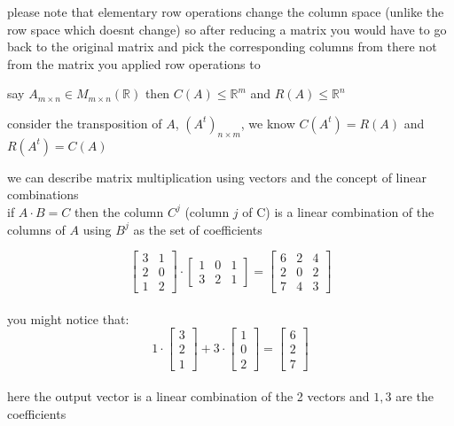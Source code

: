 \documentclass[a4paper,12pt]{article}
\begin{document}
\begin{definition}
\begin{note}
please note that elementary row operations change the column space (unlike the row space which doesnt change) so after reducing a matrix you would have to go back to the original matrix and pick the corresponding columns from there not from the matrix you applied row operations to\\
\end{note}
\begin{my_example}
say \(A_{m \times n} \in M_{m \times n}(\mathbb{R})\) then \(C(A) \leq \mathbb{R}^m\) and \(R(A) \leq \mathbb{R}^n\)\\
\end{my_example}
\begin{characteristic}
consider the transposition of \(A\), \((A^t)_{n \times m}\), we know \(C(A^t) = R(A)\) and \(R(A^t) = C(A)\)\\
\end{characteristic}
\begin{characteristic}
we can describe matrix multiplication using vectors and the concept of linear combinations\\
if \(A \cdot B = C\) then the column \(C^j\) (column \(j\) of C) is a linear combination of the columns of \(A\) using \(B^j\) as the set of coefficients\\
\begin{my_example}
\[\left[\begin{array}{rr} 3 & 1 \\ 2 & 0 \\ 1 & 2 \end{array}\right] \cdot \left[\begin{array}{rrr} 1 & 0 & 1 \\ 3 & 2 & 1 \end{array}\right] = \left[\begin{array}{rrr} 6 & 2 & 4 \\ 2 & 0 & 2 \\ 7 & 4 & 3 \end{array}\right]\]\\

you might notice that:\\
\[1 \cdot \left[\begin{array}{r} 3 \\ 2 \\ 1 \end{array}\right] + 3 \cdot \left[\begin{array}{r} 1 \\ 0 \\ 2 \end{array}\right] = \left[\begin{array}{r} 6 \\ 2 \\ 7 \end{array}\right]\]\\
here the output vector is a linear combination of the 2 vectors and \(1,3\) are the coefficients\\
\end{my_example}
\end{characteristic}


\end{definition}
\end{document}
